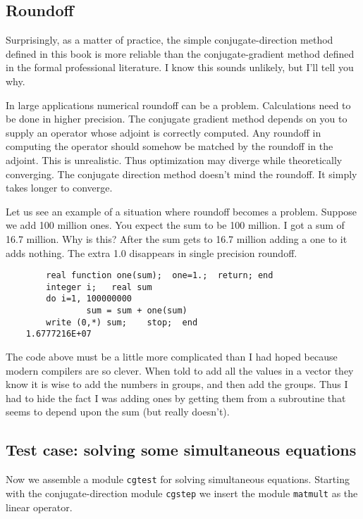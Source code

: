 \subsection{Roundoff}

Surprisingly, as a matter of practice, the simple conjugate-direction method
defined in this book is more reliable than the conjugate-gradient method
defined in the formal professional literature.
I know this sounds unlikely, but I'll tell you why.
\par
In large applications numerical roundoff can be a problem. 
Calculations need to be done in higher precision.
The conjugate gradient method depends on you to supply an operator
whose adjoint is correctly computed.
Any roundoff in computing the operator should somehow be matched
by the roundoff in the adjoint.   This is unrealistic.
Thus optimization may diverge while theoretically converging.
The conjugate direction method doesn't mind the roundoff.
It simply takes longer to converge.
\par
Let us see an example of a situation where roundoff becomes a problem.
Suppose we add 100 million ones.  You expect the sum to be 100 million.
I got a sum of 16.7 million.
Why is this?
After the sum gets to 16.7 million adding a one to it adds nothing.
The extra 1.0 disappears in single precision roundoff.
\par
\begin{verbatim}
        real function one(sum);  one=1.;  return; end
        integer i;   real sum
        do i=1, 100000000
                sum = sum + one(sum)
        write (0,*) sum;    stop;  end
	1.6777216E+07
\end{verbatim}
\par
The code above must be a little more complicated than I had hoped
because modern compilers are so clever.
When told to add all the values in a vector they know
it is wise to add the numbers in groups, and then add the groups.
Thus I had to hide the fact I was adding ones by getting them
from a subroutine that seems to depend upon the sum (but really
doesn't).

\subsection{Test case: solving some simultaneous equations}
\par
Now we assemble a module \texttt{cgtest} for solving simultaneous equations.
Starting with the conjugate-direction module {\tt cgstep} 
we insert the module \texttt{matmult}  as the linear operator.

